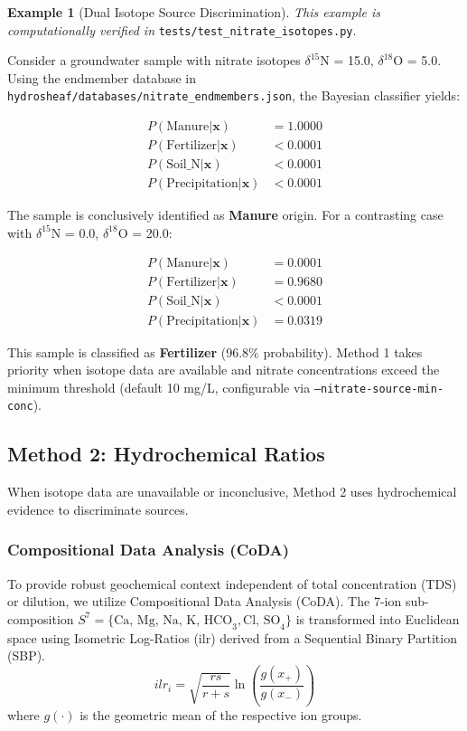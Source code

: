 \documentclass[12pt,a4paper]{article}
\theoremstyle{plain}
\theoremstyle{definition}
\newtheorem{example}[theorem]{Example}
\theoremstyle{remark}
\begin{document}
\begin{example}[Dual Isotope Source Discrimination]\label{ex:nitrate_isotope}
	\textit{This example is computationally verified in} \texttt{tests/test\_nitrate\_isotopes.py}.

	Consider a groundwater sample with nitrate isotopes $\delta^{15}$N = 15.0\textperthousand, $\delta^{18}$O = 5.0\textperthousand. Using the endmember database in \texttt{hydrosheaf/databases/nitrate\_endmembers.json}, the Bayesian classifier yields:

	\begin{align*}
		P(\text{Manure} | \mathbf{x})        & = 1.0000 \\
		P(\text{Fertilizer} | \mathbf{x})    & < 0.0001 \\
		P(\text{Soil\_N} | \mathbf{x})       & < 0.0001 \\
		P(\text{Precipitation} | \mathbf{x}) & < 0.0001
	\end{align*}

	The sample is conclusively identified as \textbf{Manure} origin. For a contrasting case with $\delta^{15}$N = 0.0\textperthousand, $\delta^{18}$O = 20.0\textperthousand:

	\begin{align*}
		P(\text{Manure} | \mathbf{x})        & = 0.0001 \\
		P(\text{Fertilizer} | \mathbf{x})    & = 0.9680 \\
		P(\text{Soil\_N} | \mathbf{x})       & < 0.0001 \\
		P(\text{Precipitation} | \mathbf{x}) & = 0.0319
	\end{align*}

	This sample is classified as \textbf{Fertilizer} (96.8\% probability). Method 1 takes priority when isotope data are available and nitrate concentrations exceed the minimum threshold (default 10 mg/L, configurable via \texttt{--nitrate-source-min-conc}).
\end{example}

\subsection{Method 2: Hydrochemical Ratios}

When isotope data are unavailable or inconclusive, Method 2 uses hydrochemical evidence to discriminate sources.

\subsubsection{Compositional Data Analysis (CoDA)}
To provide robust geochemical context independent of total concentration (TDS) or dilution, we utilize Compositional Data Analysis (CoDA). The 7-ion sub-composition $S^7 = \{\text{Ca, Mg, Na, K, HCO}_3, \text{Cl, SO}_4\}$ is transformed into Euclidean space using Isometric Log-Ratios (ilr) derived from a Sequential Binary Partition (SBP).
\begin{equation}
	ilr_i = \sqrt{\frac{r s}{r+s}} \ln\left( \frac{g(x_+)}{g(x_-)} \right)
\end{equation}
where $g(\cdot)$ is the geometric mean of the respective ion groups.
\end{document}
